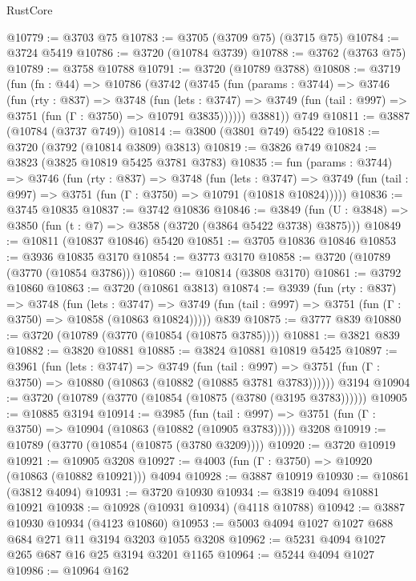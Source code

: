 \begin{lexlean}{RustCore}
\begin{coremodule}
@10779 := @3703 @75
@10783 := @3705 (@3709 @75) (@3715 @75)
@10784 := @3724 @5419
@10786 := @3720 (@10784 @3739)
@10788 := @3762 (@3763 @75)
@10789 := @3758 @10788
@10791 := @3720 (@10789 @3788)
@10808 := @3719
    (fun (fn : @44) =>
    @10786
      (@3742
        (@3745
          (fun (params : @3744) =>
          @3746
            (fun (rty : @837) =>
            @3748
              (fun (lets : @3747) =>
              @3749 (fun (tail : @997) => @3751 (fun (Γ : @3750) => @10791 @3835))))))
        @3881))
    @749
@10811 := @3887 (@10784 (@3737 @749))
@10814 := @3800 (@3801 @749) @5422
@10818 := @3720 (@3792 (@10814 @3809) @3813)
@10819 := @3826 @749
@10824 := @3823 (@3825 @10819 @5425 @3781 @3783)
@10835 := fun (params : @3744) =>
  @3746
    (fun (rty : @837) =>
    @3748
      (fun (lets : @3747) =>
      @3749 (fun (tail : @997) => @3751 (fun (Γ : @3750) => @10791 (@10818 @10824)))))
@10836 := @3745 @10835
@10837 := @3742 @10836
@10846 := @3849 (fun (U : @3848) => @3850 (fun (t : @7) => @3858 (@3720 (@3864 @5422 @3738) @3875)))
@10849 := @10811 (@10837 @10846) @5420
@10851 := @3705 @10836 @10846
@10853 := @3936 @10835 @3170
@10854 := @3773 @3170
@10858 := @3720 (@10789 (@3770 (@10854 @3786)))
@10860 := @10814 (@3808 @3170)
@10861 := @3792 @10860
@10863 := @3720 (@10861 @3813)
@10874 := @3939
    (fun (rty : @837) =>
    @3748
      (fun (lets : @3747) =>
      @3749 (fun (tail : @997) => @3751 (fun (Γ : @3750) => @10858 (@10863 @10824)))))
    @839
@10875 := @3777 @839
@10880 := @3720 (@10789 (@3770 (@10854 (@10875 @3785))))
@10881 := @3821 @839
@10882 := @3820 @10881
@10885 := @3824 @10881 @10819 @5425
@10897 := @3961
    (fun (lets : @3747) =>
    @3749
      (fun (tail : @997) =>
      @3751 (fun (Γ : @3750) => @10880 (@10863 (@10882 (@10885 @3781 @3783))))))
    @3194
@10904 := @3720 (@10789 (@3770 (@10854 (@10875 (@3780 (@3195 @3783))))))
@10905 := @10885 @3194
@10914 := @3985
    (fun (tail : @997) => @3751 (fun (Γ : @3750) => @10904 (@10863 (@10882 (@10905 @3783)))))
    @3208
@10919 := @10789 (@3770 (@10854 (@10875 (@3780 @3209))))
@10920 := @3720 @10919
@10921 := @10905 @3208
@10927 := @4003 (fun (Γ : @3750) => @10920 (@10863 (@10882 @10921))) @4094
@10928 := @3887 @10919
@10930 := @10861 (@3812 @4094)
@10931 := @3720 @10930
@10934 := @3819 @4094 @10881 @10921
@10938 := @10928 (@10931 @10934) (@4118 @10788)
@10942 := @3887 @10930 @10934 (@4123 @10860)
@10953 := @5003 @4094 @1027 @1027 @688 @684 @271 @11 @3194 @3203 @1055 @3208
@10962 := @5231 @4094 @1027 @265 @687 @16 @25 @3194 @3201 @1165
@10964 := @5244 @4094 @1027
@10986 := @10964
    @162

\end{coremodule}
\end{lexlean}
